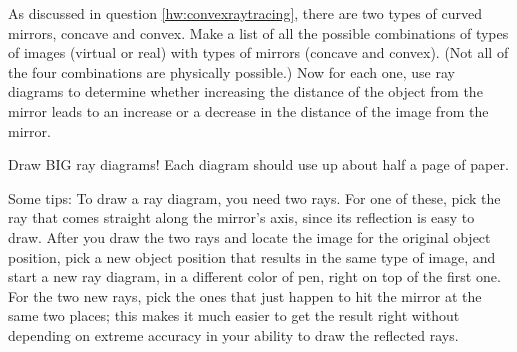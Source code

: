 As discussed in question \ref{hw:convexraytracing}, there are two types of curved
mirrors, concave and convex. Make a list of all the possible
combinations of types of images (virtual or real) with types
of mirrors (concave and convex). (Not all of the four
combinations are physically possible.) Now for each one, use
ray diagrams to determine whether increasing the distance of
the object from the mirror leads to an increase or a
decrease in the distance of the image from the mirror.

Draw BIG ray diagrams! Each diagram should use up about
half a page of paper.

Some tips: To draw a ray diagram, you need two rays. For one
of these, pick the ray that comes straight along the
mirror's axis, since its reflection is easy to draw. After
you draw the two rays and locate the image for the original
object position, pick a new object position that results in
the same type of image, and start a new ray diagram, in a
different color of pen, right on top of the first one. For
the two new rays, pick the ones that just happen to hit the
mirror at the same two places; this makes it much easier to
get the result right without depending on extreme accuracy
in your ability to draw the reflected rays.
